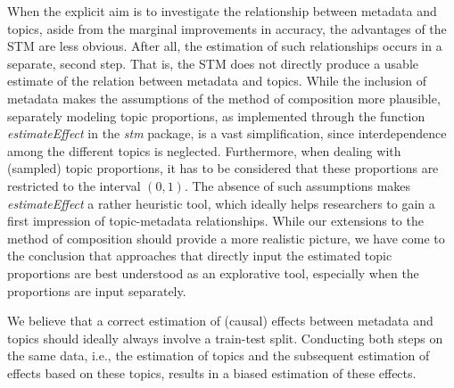 When the explicit aim is to investigate the relationship between metadata and topics, aside from the marginal improvements in accuracy, the advantages of the STM are less obvious. After all, the estimation of such relationships occurs in a separate, second step. That is, the STM does not directly produce a usable estimate of the relation between metadata and topics. While the inclusion of metadata makes the assumptions of the method of composition more plausible, separately modeling topic proportions, as implemented through the function \textit{estimateEffect} in the \textit{stm} package, is a vast simplification, since interdependence among the different topics is neglected. Furthermore, when dealing with (sampled) topic proportions, it has to be considered that these proportions are restricted to the interval $(0,1)$. The absence of such assumptions makes \textit{estimateEffect} a rather heuristic tool, which ideally helps researchers to gain a first impression of topic-metadata relationships. While our extensions to the method of composition should provide a more realistic picture, we have come to the conclusion that approaches that directly input the estimated topic proportions are best understood as an explorative tool, especially when the proportions are input separately.

We believe that a correct estimation of (causal) effects between metadata and topics should ideally always involve a train-test split. Conducting both steps on the same data, i.e., the estimation of topics and the subsequent estimation of effects based on these topics, results in a biased estimation of these effects. 
